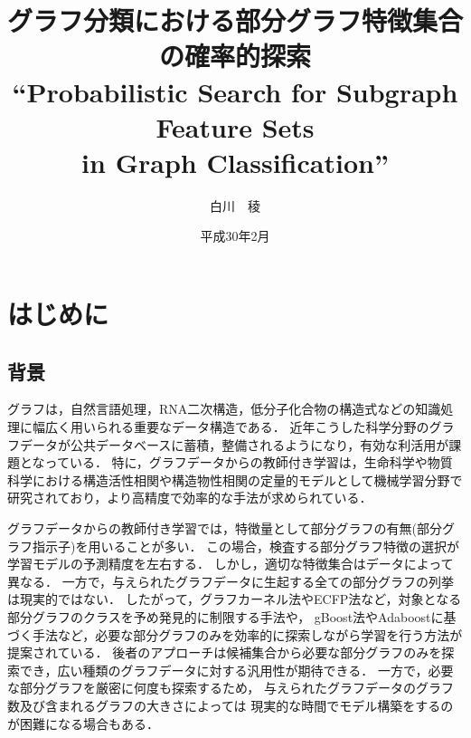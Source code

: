 \documentclass[12pt,fleqn]{jsotsuron}
\title{グラフ分類における部分グラフ特徴集合の確率的探索\\
``Probabilistic Search for Subgraph Feature Sets \\
in Graph Classification''}
\author{白川　稜}
\date{平成30年2月}
\begin{document}
\maketitle
\tableofcontents
\newpage


\chapter{はじめに}
\section{背景}
グラフは，自然言語処理\cite{Adaboost}，RNA二次構造\cite{DBLP:conf/psb/KarklinMH05}，低分子化合物の構造式\cite{Takigawa201350}などの知識処理に幅広く用いられる重要なデータ構造である．
近年こうした科学分野のグラフデータが公共データベースに蓄積，整備されるようになり，有効な利活用が課題となっている．
特に，グラフデータからの教師付き学習は，生命科学や物質科学における構造活性相関や構造物性相関の定量的モデルとして機械学習分野で研究されており，より高精度で効率的な手法が求められている．

グラフデータからの教師付き学習では，特徴量として部分グラフの有無(部分グラフ指示子)を用いることが多い．
この場合，検査する部分グラフ特徴の選択が学習モデルの予測精度を左右する．
しかし，適切な特徴集合はデータによって異なる．
一方で，与えられたグラフデータに生起する全ての部分グラフの列挙は現実的ではない．
したがって，グラフカーネル法\cite{DBLP:journals/jmlr/ShervashidzeSLMB11}やECFP法\cite{DBLP:journals/jcisd/RogersH10}など，対象となる部分グラフのクラスを予め発見的に制限する手法や，
gBoost法\cite{gBoost}やAdaboostに基づく手法\cite{Adaboost}など，必要な部分グラフのみを効率的に探索しながら学習を行う方法が提案されている．
後者のアプローチは候補集合から必要な部分グラフのみを探索でき，広い種類のグラフデータに対する汎用性が期待できる．
一方で，必要な部分グラフを厳密に何度も探索するため，
与えられたグラフデータのグラフ数及び含まれるグラフの大きさによっては
現実的な時間でモデル構築をするのが困難になる場合もある．
\end{document}
